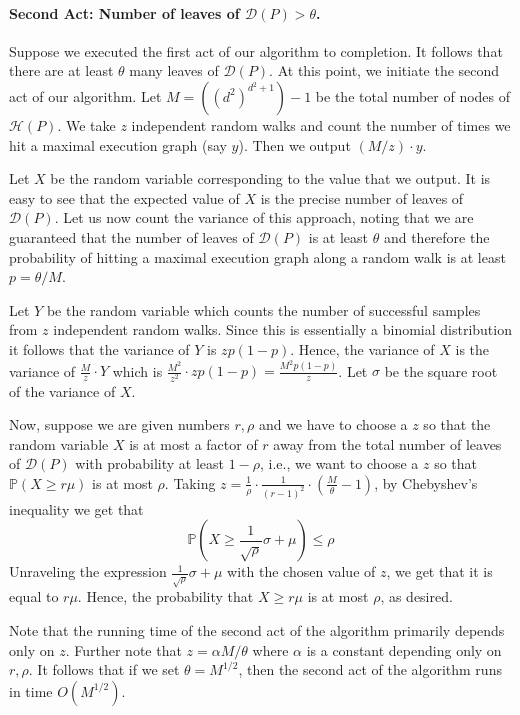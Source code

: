 \paragraph{Second Act: Number of leaves of $\mathcal{D}(P) > \theta$. }

Suppose we executed the first act of our algorithm to completion. It follows that there
are at least $\theta$ many leaves of $\mathcal{D}(P)$. At this point, we initiate the second act of our algorithm. Let $M = ((d^2)^{d^2+1})-1$ be the total number of nodes
of $\mathcal{H}(P)$. We take $z$ independent random walks and count the number of times we hit a maximal execution graph (say $y$). Then we output $(M/z) \cdot y$. 

Let $X$ be the random variable corresponding to the value that we output.
It is easy to see that the expected value of $X$ is the precise number
of leaves of $\mathcal{D}(P)$. Let us now count the variance of this approach, noting that
we are guaranteed that the number of leaves of $\mathcal{D}(P)$ is at least $\theta$
and therefore the probability of hitting a maximal execution graph along a random walk
is at least $p = \theta/M$. 

Let $Y$ be the random variable which counts the number of successful samples from $z$ independent random walks. Since this is essentially a binomial distribution it follows that
the variance of $Y$ is $zp(1-p)$. Hence, the variance of $X$ is the variance of
$\frac{M}{z} \cdot Y$ which is $\frac{M^2}{z^2} \cdot z p (1-p) = \frac{M^2 p (1-p)}{z}$. 
Let $\sigma$ be the square root of the variance of $X$. 

Now, suppose we are given numbers $r, \rho$ and we have to choose a $z$ so that the random variable $X$ is at most a factor of $r$ away from the total number of leaves of $\mathcal{D}(P)$ with probability at least $1-\rho$, i.e., we want to choose a $z$ so that $\mathbb{P}(X \ge r \mu )$ is at most $\rho$. Taking $z = \frac{1}{\rho} \cdot \frac{1}{(r-1)^2} \cdot \left(\frac{M}{\theta} - 1 \right)$, by Chebyshev's inequality we get that $$\mathbb{P}(X \ge \frac{1}{\sqrt{\rho}} \sigma + \mu ) \le \rho$$ 
Unraveling the expression $\frac{1}{\sqrt{\rho}} \sigma + \mu$ with the chosen value of $z$,
we get that it is equal to $r \mu$. Hence, the probability that $X \ge r \mu$ is at most $\rho$, as desired.

Note that the running time of the second act of the algorithm primarily depends only on $z$. Further note that $z = \alpha M/\theta$ where $\alpha$ is a constant depending only on $r, \rho$.
It follows that if we set $\theta = M^{1/2}$, then the second act of the algorithm runs in time $O(M^{1/2})$.

